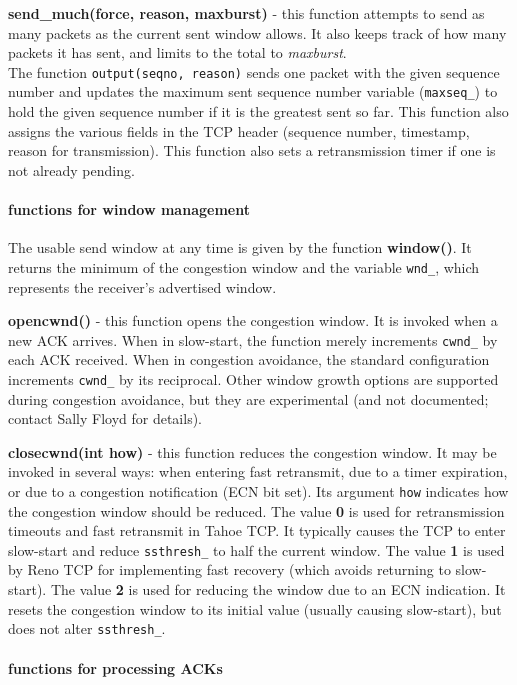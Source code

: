 \documentclass{article}
\begin{document}
{\bf send\_much(force, reason, maxburst)} - this function
attempts to send as many packets as the current sent window allows.
It also keeps track of how many packets it has sent, and limits to the
total to {\em maxburst}. \\
The function {\tt output(seqno, reason)} sends one packet
with the given sequence number and updates the maximum sent sequence
number variable ({\tt maxseq\_}) to hold the given sequence number if
it is the greatest sent so far.
This function also assigns the various fields in the TCP
header (sequence number, timestamp, reason for transmission).
This function also sets a retransmission timer if one is not already
pending.

\paragraph{functions for window management}

The usable send window at any time is given by the function {\bf window()}.
It returns the minimum of the congestion window and the variable {\tt wnd\_},
which represents the receiver's advertised window.

{\bf opencwnd()} - this function opens the congestion window.  It is invoked
when a new ACK arrives.
When in slow-start, the function merely increments {\tt cwnd\_} by each
ACK received.
When in congestion avoidance, the standard configuration increments {\tt cwnd\_}
by its reciprocal.
Other window growth options are supported during congestion avoidance,
but they are experimental (and not documented; contact Sally Floyd for
details).

{\bf closecwnd(int how)} - this function reduces the congestion window. It
may be invoked in several ways: when entering fast retransmit, due to
a timer expiration, or due to a congestion notification (ECN bit set).
Its argument {\tt how} indicates how the congestion window should
be reduced.  The value {\bf 0} is used for retransmission timeouts and
fast retransmit in Tahoe TCP.  It typically causes the TCP to enter
slow-start and reduce {\tt ssthresh\_} to half the current window.
The value {\bf 1} is used by Reno TCP for implementing fast recovery
(which avoids returning to slow-start).
The value {\bf 2} is used for reducing the window due to an ECN indication.
It resets the congestion window to its initial value (usually causing
slow-start), but does not alter {\tt ssthresh\_}.

\paragraph{functions for processing ACKs}
\end{document}
